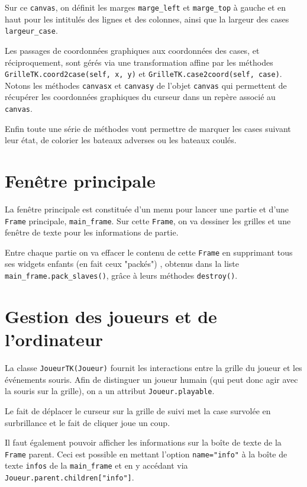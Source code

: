Sur ce \texttt{canvas}, on définit les marges \texttt{marge\_left} et \texttt{marge\_top} à gauche et en haut pour les intitulés des lignes et des colonnes, ainsi que la largeur des cases \texttt{largeur\_case}. 

\medskip

Les passages de coordonnées graphiques aux coordonnées des cases, et réciproquement, sont gérés via  une transformation affine par les méthodes \texttt{GrilleTK.coord2case(self, x, y)} et \texttt{GrilleTK.case2coord(self, case)}. Notons les méthodes \texttt{canvasx} et \texttt{canvasy} de l'objet \texttt{canvas} qui permettent de récupérer les coordonnées graphiques du curseur dans un repère associé au \texttt{canvas}.

\medskip

Enfin toute une série de méthodes vont permettre de marquer les cases suivant leur état, de colorier les bateaux adverses ou les bateaux coulés.  

\section{Fenêtre principale}
La fenêtre principale est constituée d'un menu pour lancer une partie et d'une \texttt{Frame} principale, \texttt{main\_frame}. Sur cette \texttt{Frame}, on va dessiner les grilles et une fenêtre de texte pour les informations de partie.

\medskip

Entre chaque partie on va effacer le contenu de cette \texttt{Frame} en supprimant tous ses widgets enfants (en fait ceux "packés") , obtenus dans la liste \texttt{main\_frame.pack\_slaves()}, grâce à leurs méthodes \texttt{destroy()}. 

\section{Gestion des joueurs et de l'ordinateur}
La classe \texttt{JoueurTK(Joueur)} fournit les interactions entre la grille du joueur et les événements souris. Afin de distinguer un joueur humain (qui peut donc agir avec la souris sur la grille), on a un attribut \texttt{Joueur.playable}.

Le fait de déplacer le curseur sur la grille de suivi met la case survolée en surbrillance et le fait de cliquer joue un coup.

Il faut également pouvoir afficher les informations sur la boîte de texte de la \texttt{Frame} parent. Ceci est possible  en mettant l'option \texttt{name="info"} à la boîte de texte \texttt{infos} de la \texttt{main\_frame} et en y accédant via \texttt{Joueur.parent.children["info"]}.

